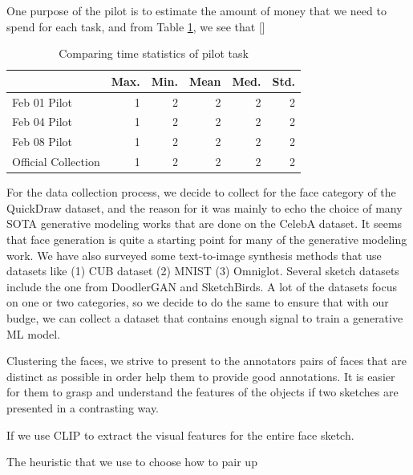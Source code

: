 One purpose of the pilot is to estimate the amount of money that we need to spend for each task, and from Table \ref{v2.workertime}, we see that []
\begin{table}[h!]
\begin{minipage}[b]{1\textwidth}
\centering
\begin{tabular}{l|rrrrr}
\toprule
~ & Max. & Min. & Mean & Med. & Std. \\
\midrule
Feb 01 Pilot  & 1 & 2 & 2 & 2 & 2   \\
Feb 04 Pilot  & 1 & 2 & 2 & 2 & 2  \\
Feb 08 Pilot  & 1 & 2 & 2 & 2 & 2  \\
Official Collection  & 1 & 2 & 2 & 2 & 2  \\
\bottomrule
\end{tabular}
\caption{Comparing time statistics of pilot task}
\label{v2.workertime}
\end{minipage}
\end{table}

For the data collection process, we decide to collect for the face category of the QuickDraw dataset, and the reason for it was mainly to echo the choice of many SOTA generative modeling works that are done on the CelebA dataset. It seems that face generation is quite a starting point for many of the generative modeling work. We have also surveyed some text-to-image synthesis methods that use datasets like (1) CUB dataset (2) MNIST (3) Omniglot. Several sketch datasets include the one from DoodlerGAN and SketchBirds. A lot of the datasets focus on one or two categories, so we decide to do the same to ensure that with our budge, we can collect a dataset that contains enough signal to train a generative ML model. 

Clustering the faces, we strive to present to the annotators pairs of faces that are distinct as possible in order help them to provide good annotations. It is easier for them to grasp and understand the features of the objects if two sketches are presented in a contrasting way. 



If we use CLIP to extract the visual features for the entire face sketch.



The heuristic that we use to choose how to pair up